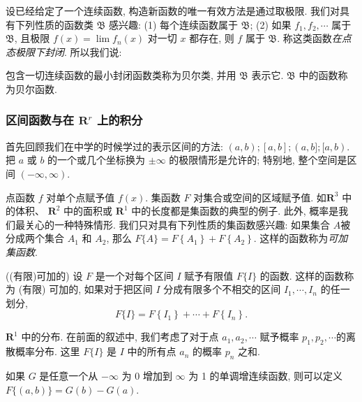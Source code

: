 设已经给定了一个连续函数, 构造新函数的唯一有效方法是通过取极限. 我们对具有下列性质的函数类 $\mathfrak{B}$ 感兴趣: (1) 每个连续函数属于 $\mathfrak{B}$; (2) 如果 $f_1, f_2, \cdots$ 属于 $\mathfrak{B}$, 且极限 $f(x)=\lim f_n(x)$ 对一切 $x$ 都存在, 则 $f$ 属于 $\mathfrak{B}$. 称这类函数\emph{在点态极限下封闭}. 所以我们说: 

\begin{definition*}
    包含一切连续函数的最小封闭函数类称为贝尔类, 并用 $\mathfrak{B}$ 表示它. $\mathfrak{B}$ 中的函数称为贝尔函数. 
\end{definition*}

\subsubsection*{区间函数与在 $\mathbf{R}^r$ 上的积分}

首先回顾我们在中学的时候学过的表示区间的方法: $(a,b); [a, b]; (a,b]; [a,b)$. 把 $a$ 或 $b$ 的一个或几个坐标换为 $\pm \infty$ 的极限情形是允许的; 特别地, 整个空间是区间 $(-\infty, \infty)$.

点函数 $f$ 对单个点赋予值 $f(x)$. 集函数 $F$ 对集合或空间的区域赋予值. 如$\mathbf{R}^3$ 中的体积、 $\mathbf{R}^2$ 中的面积或 $\mathbf{R}^1$ 中的长度都是集函数的典型的例子. 此外, 概率是我们最关心的一种特殊情形. 我们只对具有下列性质的集函数感兴趣: 如果集合 $A$被分成两个集合 $A_1$ 和 $A_2$, 那么 $F\{A\}=F\left\{A_1\right\}+F\left\{A_2\right\}$. 这样的函数称为\emph{可加集函数}.

\begin{definition*}((有限)可加的)
    设 $F$ 是一个对每个区间 $I$ 赋予有限值 $F\{I\}$ 的函数. 这样的函数称为 (有限) 可加的, 如果对于把区间 $I$ 分成有限多个不相交的区间 $I_1, \cdots, I_n$ 的任一划分, 
$$
F\{I\}=F\left\{I_1\right\}+\cdots+F\left\{I_n\right\} .
$$
\end{definition*}

\begin{example}
    $\mathbf{R}^1$ 中的分布. 在前面的叙述中, 我们考虑了对于点 $a_1, a_2, \cdots$ 赋予概率 $p_1, p_2, \cdots$的离散概率分布. 这里 $F\{I\}$ 是 $I$ 中的所有点 $a_n$ 的概率 $p_n$ 之和.

    如果 $G$ 是任意一个从 $-\infty$ 为 0 增加到 $\infty$ 为 1 的单调增连续函数, 则可以定义 $F\{(a, b)\}=G(b)-G(a)$.
\end{example}


